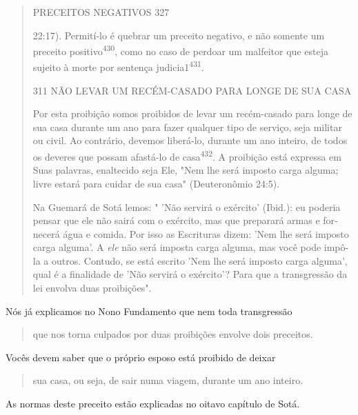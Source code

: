 \begin{quote}
PRECEITOS NEGATIVOS 327

22:17). Permití-lo é quebrar um preceito negativo, e não somente um
preceito positivo\textsuperscript{430}, como no caso de perdoar um
malfeitor que esteja sujeito à morte por sentença
judicia1\textsuperscript{431}.

311 NÃO LEVAR UM RECÉM-CASADO PARA LONGE DE SUA CASA

Por esta proibição somos proibidos de levar um recém-casado para longe
de sua casa durante um ano para fazer qualquer tipo de serviço, seja
mili­tar ou civil. Ao contrário, devemos liberá-lo, durante um ano
inteiro, de todos os deveres que possam afastá-lo de
casa\textsuperscript{432}. A proibição está expressa em Suas palavras,
enaltecido seja Ele, "Nem lhe será imposto carga alguma; livre estará
para cuidar de sua casa" (Deuteronômio 24:5).

Na Guemará de Sotá lemos: " 'Não servirá o exército' (Ibid.): eu
po­deria pensar que ele não sairá com o exército, mas que preparará
armas e for­necerá água e comida. Por isso as Escrituras dizem: 'Nem lhe
será imposto car­ga alguma'. A \emph{ele} não será imposta carga alguma,
mas você pode impô-la a ou­tros. Contudo, se está escrito 'Nem lhe será
imposto carga alguma', qual é a finalidade de 'Não servirá o exército'?
Para que a transgressão da lei envolva duas proibições".
\end{quote}

Nós já explicamos no Nono Fundamento que nem toda transgressão

\begin{quote}
que nos torna culpados por duas proibições envolve dois preceitos.
\end{quote}

Vocês devem saber que o próprio esposo está proibido de deixar

\begin{quote}
sua casa, ou seja, de sair numa viagem, durante um ano inteiro.
\end{quote}

As normas deste preceito estão explicadas no oitavo capítulo de Sotá.

